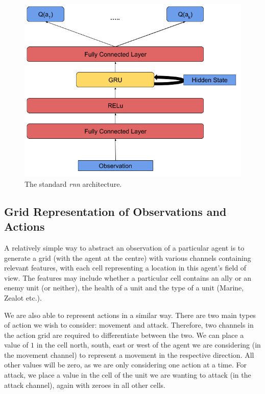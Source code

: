 \begin{figure}
    \centering
    \includegraphics[scale=0.45]{images/agent_diagrams/rnn_agent_diagram.png}
    \caption{The standard \textit{rnn} architecture.}
    \label{fig:rnn_agent_diagram}
\end{figure}






\subsection{Grid Representation of Observations and Actions}

A relatively simple way to abstract an observation of a particular agent is to generate a grid (with the agent at the centre) with various channels containing relevant features, with each cell representing a location in this agent's field of view. The features may include whether a particular cell contains an ally or an enemy unit (or neither), the health of a unit and the type of a unit (Marine, Zealot etc.). 

We are also able to represent actions in a similar way. There are two main types of action we wish to consider: movement and attack. Therefore, two channels in the action grid are required to differentiate between the two. We can place a value of $1$ in the cell north, south, east or west of the agent we are considering (in the movement channel) to represent a movement in the respective direction. All other values will be zero, as we are only considering one action at a time. For attack, we place a value in the cell of the unit we are wanting to attack (in the attack channel), again with zeroes in all other cells.

